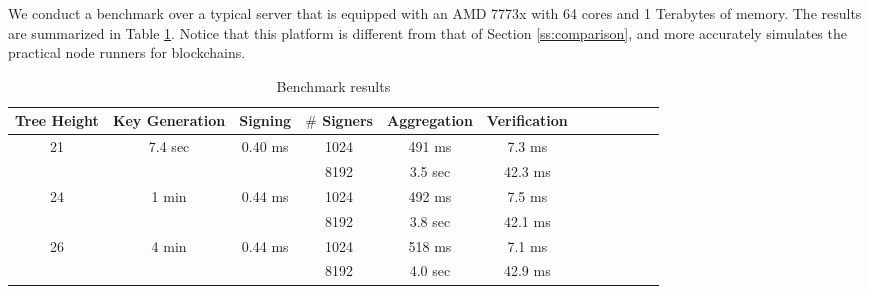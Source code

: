 We conduct a benchmark over a typical server that is equipped with an AMD 7773x with
64 cores and 1 Terabytes of memory.
The results are summarized in Table \ref{tab:bench_results}.
Notice that this platform is different from that of Section \ref{ss:comparison},
and more accurately simulates the practical node runners for blockchains.

\begin{table}[t]\centering
  \begin{tabular}{|c|c|c|c|c|c|c|c|c||c|c|c|}\hline
      Tree Height         & Key Generation            & Signing                   & $\#$ Signers  &  Aggregation & Verification  \\ \hline\hline
      \multirow{2}{*}{21} & \multirow{2}{*}{7.4 sec}  & \multirow{2}{*}{0.40 ms}  & 1024    &   491 ms     &  7.3 ms       \\\cline{4-6}
                          &                           &                           & 8192    &   3.5 sec    &  42.3 ms      \\\hline\hline

      \multirow{2}{*}{24} & \multirow{2}{*}{1 min}    & \multirow{2}{*}{0.44 ms}  & 1024    &   492 ms     &  7.5 ms       \\\cline{4-6}
                          &                           &                           & 8192    &   3.8 sec    &  42.1 ms      \\\hline\hline

      \multirow{2}{*}{26} & \multirow{2}{*}{  4 min}  & \multirow{2}{*}{0.44 ms}  & 1024    &   518 ms     &  7.1 ms       \\\cline{4-6}
                          &                           &                           & 8192    &   4.0 sec    &  42.9 ms      \\\hline

  \end{tabular}\\
  \caption{Benchmark results}
  \label{tab:bench_results}
\end{table}

